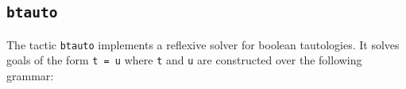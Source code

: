 \begin{coq_example*}







\subsection{\tt btauto}
\label{btauto}

The tactic \texttt{btauto} implements a reflexive solver for boolean tautologies. It
solves goals of the form {\tt t = u} where {\tt t} and {\tt u} are constructed
over the following grammar:


\end{coq_example*}
